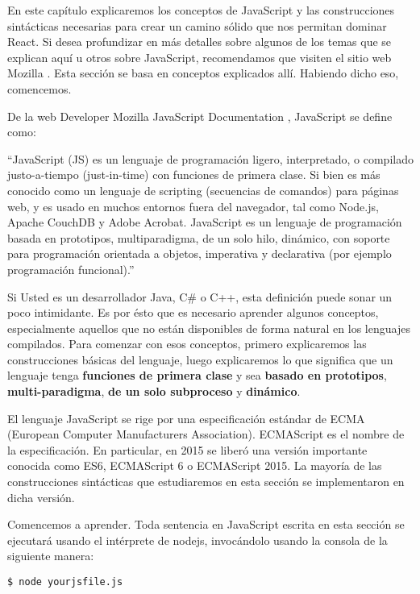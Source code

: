 \documentclass[a4paper, oneside, titlepage, 12pt]{book}
\begin{document}
En este capítulo explicaremos los conceptos de JavaScript y las construcciones sintácticas necesarias para crear un camino sólido que nos permitan dominar React. Si desea profundizar en más detalles sobre algunos de los temas que se explican aquí u otros sobre JavaScript, recomendamos que visiten el sitio web Mozilla \cite{mozilla}. Esta sección se basa en conceptos explicados allí. Habiendo dicho eso, comencemos. 

De la web Developer Mozilla JavaScript Documentation \cite{mozilla}, JavaScript se define como:

``JavaScript (JS) es un lenguaje de programación ligero, interpretado, o compilado justo-a-tiempo (just-in-time) con funciones de primera clase. Si bien es más conocido como un lenguaje de scripting (secuencias de comandos) para páginas web, y es usado en muchos entornos fuera del navegador, tal como Node.js, Apache CouchDB y Adobe Acrobat. JavaScript es un lenguaje de programación basada en prototipos, multiparadigma, de un solo hilo, dinámico, con soporte para programación orientada a objetos, imperativa y declarativa (por ejemplo programación funcional).''
\newline

Si Usted es un desarrollador Java, C\# o C++, esta definición puede sonar un poco intimidante. Es por ésto que es necesario aprender algunos conceptos, especialmente aquellos que no están disponibles de forma natural en los lenguajes compilados. Para comenzar con esos conceptos, primero explicaremos las construcciones básicas del lenguaje, luego explicaremos lo que significa que un lenguaje tenga \textbf{funciones de primera clase} y sea \textbf {basado en prototipos}, \textbf{multi-paradigma}, \textbf{de un solo subproceso} y \textbf{dinámico}.
\newline

El lenguaje JavaScript se rige por una especificación estándar de ECMA\cite{ecma} (European Computer Manufacturers Association). ECMAScript es el nombre de la especificación. En particular, en 2015 se liberó una versión importante conocida como ES6, ECMAScript 6 o ECMAScript 2015. La mayoría de las construcciones sintácticas que estudiaremos en esta sección se implementaron en dicha versión.
\newline

Comencemos a aprender. Toda sentencia en JavaScript escrita en esta sección se ejecutará usando el intérprete de nodejs, invocándolo usando la consola de la siguiente manera:
\begin{verbatim}
$ node yourjsfile.js
\end{verbatim}
\end{document}
